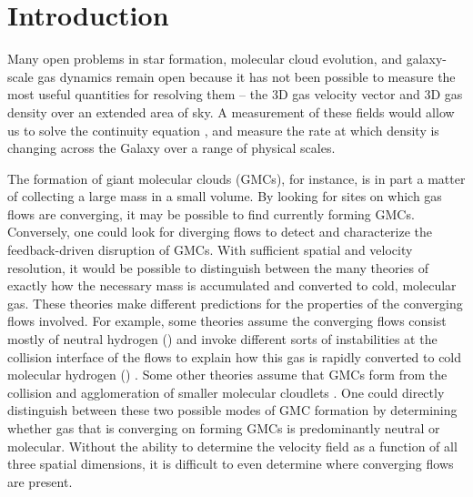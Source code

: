 \section{Introduction}
Many open problems in star formation, molecular cloud evolution, and galaxy-scale gas dynamics remain open because it has not been possible to measure the most useful quantities for resolving them -- the 3D gas velocity vector and 3D gas density over an extended area of sky. A measurement of these fields would allow us to solve the continuity equation \citep{euler1757principes}, and measure the rate at which density is changing across the Galaxy over a range of physical scales. 

The formation of giant molecular clouds (GMCs), for instance, is in part a matter of collecting a large mass in a small volume. 
By looking for sites on which gas flows are converging, it may be possible to find currently forming GMCs.
Conversely, one could look for diverging flows to detect and characterize the feedback-driven disruption of GMCs.
With sufficient spatial and velocity resolution, it would be possible to distinguish between the many theories of exactly how the necessary mass is accumulated and converted to cold, molecular gas. 
These theories make different predictions for the properties of the converging flows involved. 
For example, some theories assume the converging flows consist mostly of neutral hydrogen (\atomH) and invoke different sorts of instabilities at the collision interface of the flows to explain how this gas is rapidly converted to cold molecular hydrogen (\molH) \citep[e.g. ][]{Heitsch06,Clark:2012bq,2014ApJ...790...37C}.
Some other theories assume that GMCs form from the collision and agglomeration of smaller molecular cloudlets \citep[e.g. ][]{Roberts:1987eb,Dobbs:2008ez,Tasker:2009gc}. 
One could directly distinguish between these two possible modes of GMC formation by determining whether gas that is converging on forming GMCs is predominantly neutral or molecular.
Without the ability to determine the velocity field as a function of all three spatial dimensions, it is difficult to even determine where converging flows are present.

